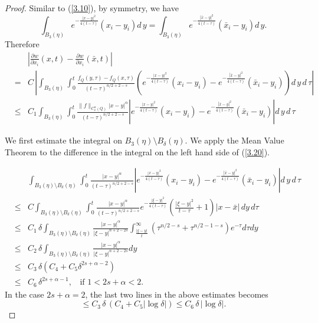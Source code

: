 \documentclass[12pt]{article}
\theoremstyle{remark}
\numberwithin{equation}{section}
\begin{document}
\begin{proof}
Similar to (\ref{3.10}), by symmetry, we have
\begin{equation} \label{3.10b}
\int_{B_3 (\eta)} e^{- \frac{|x-y|^2}{4(t-\tau)}} (x_i - y_i) d \, y = \int_{B_3 (\eta)} e^{- \frac{|\bar{x}-y|^2}{4(t-\tau)}} (\bar{x}_i -y_i) d \, y.
\end{equation}
Therefore
\begin{eqnarray}
& & \left|\frac{\partial w}{\partial x_i}(x,t) - \frac{\partial w}{\partial x_i} (\bar{x}, t)\right| \nonumber \\
& = & C \, \left| \int_{B_3(\eta)} \int_0^t \frac{  f_Q (y,\tau) - f_Q(x,\tau) }{(t-\tau)^{n/2+2-s}}  \left(  e^{- \frac{|x-y|^2}{4(t-\tau)}} (x_i-y_i) -
e^{- \frac{|\bar{x}-y|^2}{4(t-\tau)}} (\bar{x}_i-y_i)\right) d \, y \, d \, \tau \right| \nonumber \\
& \leq & C_1 \int_{B_3(\eta)} \int_0^t \frac{  \|f\|_{C_x^\alpha(Q)} |x-y|^\alpha }{(t-\tau)^{n/2+2-s}} \left|  e^{- \frac{|x-y|^2}{4(t-\tau)}} (x_i-y_i) -
e^{- \frac{|\bar{x}-y|^2}{4(t-\tau)}} (\bar{x}_i-y_i) \right| d \, y \, d \, \tau
\label{3.20}
\end{eqnarray}

We first estimate the integral on $B_3(\eta) \setminus B_\delta (\eta)$. We apply the Mean Value Theorem to the difference in the integral on the left hand side of (\ref{3.20}).

\begin{eqnarray}
& & \int_{B_3(\eta) \setminus B_\delta (\eta)} \int_0^t \frac{|x-y|^\alpha }{(t-\tau)^{n/2+2-s}} \left|  e^{- \frac{|x-y|^2}{4(t-\tau)}} (x_i-y_i) -
e^{- \frac{|\bar{x}-y|^2}{4(t-\tau)}} (\bar{x}_i-y_i) \right| d \, y \, d \, \tau \nonumber \\
& \leq & C  \int_{B_3(\eta) \setminus B_\delta (\eta)} \int_0^t \frac{|x-y|^\alpha}{(t-\tau)^{n/2+2-s}} e^{-\frac{|\xi-y|^2}{4(t-\tau)}} \left( \frac{|\xi-y|^2}{t-\tau} + 1 \right) |x - \bar{x}| \, d y \, d \tau \nonumber \\
& \leq & C_1 \, \delta \int_{B_3(\eta) \setminus B_\delta (\eta)} \frac{|x-y|^\alpha}{|\xi-y|^{n+2-2s}} \int_{\frac{|\xi-y|}{t}}^\infty ( \tau^{n/2-s} + \tau^{n/2-1-s} ) e^{-\tau} d \tau d y \nonumber \\
& \leq & C_2 \, \delta \int_{B_3(\eta) \setminus B_\delta (\eta)} \frac{|x-y|^\alpha}{|\xi-y|^{n+2-2s}} d y \nonumber \\
& \leq & C_3 \, \delta ( C_4 + C_5 \delta^{2s+\alpha -2}) \nonumber \\
& \leq & C_6 \, \delta^{2s+\alpha-1}, \;\; \mbox{ if } 1< 2s +\alpha < 2.
\label{3.21}
\end{eqnarray}
In the case $2s + \alpha =2$, the last two lines in the above estimates becomes
\begin{equation} \label{3.21a}
 \leq  C_3 \, \delta \, ( C_4 + C_5 |\log \delta|) \leq C_6 \, \delta \, |\log \delta|.
 \end{equation}


\end{proof}
\end{document}

